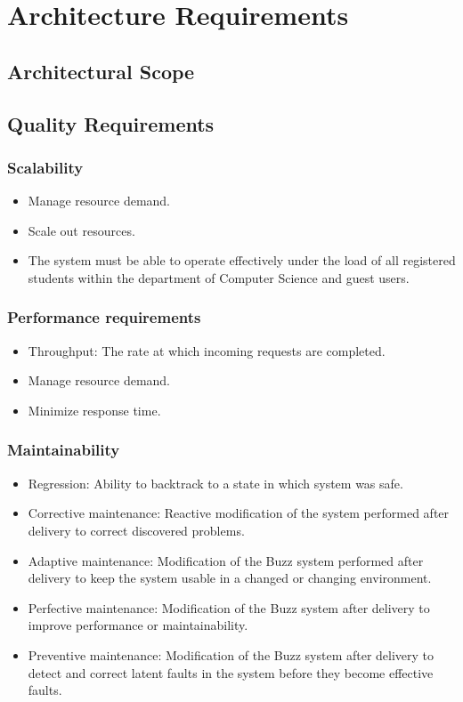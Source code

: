 \documentclass[12pt, oneside]{article}
\begin{document}
\section{Architecture Requirements}
	\subsection{Architectural Scope}
	\subsection{Quality Requirements}
		\subsubsection{Scalability}
			\begin{itemize} 
				\item Manage resource demand.
				\item Scale out resources.
				\item The system must be able to operate effectively under the load of all registered students within the department of Computer Science and guest users.
			\end{itemize}
			
		\subsubsection{Performance requirements}
			\begin{itemize}
				\item Throughput: The rate at which incoming requests are completed.
				\item Manage resource demand.
				\item Minimize response time.
			\end{itemize}
		\subsubsection{Maintainability}
			\begin{itemize}
					\item Regression: Ability to backtrack to a state in which system was safe.
					\item Corrective maintenance: Reactive modification of the system performed after delivery to correct discovered problems.
					\item Adaptive maintenance: Modification of the Buzz system performed after delivery to keep the system usable in a changed or changing environment.
					\item Perfective maintenance: Modification of the Buzz system after delivery to improve performance or maintainability.
					\item Preventive maintenance: Modification of the Buzz system after delivery to detect and correct latent faults in the system before they become effective faults.
			\end{itemize}
\end{document}
